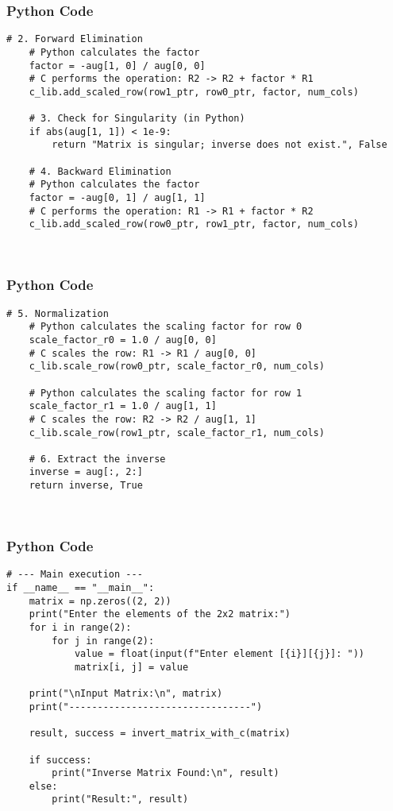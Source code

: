 \documentclass{beamer}
\begin{document}
\begin{frame}[fragile]
    \frametitle{Python Code}
    \begin{lstlisting}
# 2. Forward Elimination
    # Python calculates the factor
    factor = -aug[1, 0] / aug[0, 0]
    # C performs the operation: R2 -> R2 + factor * R1
    c_lib.add_scaled_row(row1_ptr, row0_ptr, factor, num_cols)
    
    # 3. Check for Singularity (in Python)
    if abs(aug[1, 1]) < 1e-9:
        return "Matrix is singular; inverse does not exist.", False

    # 4. Backward Elimination
    # Python calculates the factor
    factor = -aug[0, 1] / aug[1, 1]
    # C performs the operation: R1 -> R1 + factor * R2
    c_lib.add_scaled_row(row0_ptr, row1_ptr, factor, num_cols)

    
    \end{lstlisting}
\end{frame}

\begin{frame}[fragile]
    \frametitle{Python Code}
    \begin{lstlisting}
# 5. Normalization
    # Python calculates the scaling factor for row 0
    scale_factor_r0 = 1.0 / aug[0, 0]
    # C scales the row: R1 -> R1 / aug[0, 0]
    c_lib.scale_row(row0_ptr, scale_factor_r0, num_cols)
    
    # Python calculates the scaling factor for row 1
    scale_factor_r1 = 1.0 / aug[1, 1]
    # C scales the row: R2 -> R2 / aug[1, 1]
    c_lib.scale_row(row1_ptr, scale_factor_r1, num_cols)
    
    # 6. Extract the inverse
    inverse = aug[:, 2:]
    return inverse, True



    \end{lstlisting}
\end{frame}

\begin{frame}[fragile]
    \frametitle{Python Code}
    \begin{lstlisting}
# --- Main execution ---
if __name__ == "__main__":
    matrix = np.zeros((2, 2))
    print("Enter the elements of the 2x2 matrix:")
    for i in range(2):
        for j in range(2):
            value = float(input(f"Enter element [{i}][{j}]: "))
            matrix[i, j] = value

    print("\nInput Matrix:\n", matrix)
    print("--------------------------------")
    
    result, success = invert_matrix_with_c(matrix)
    
    if success:
        print("Inverse Matrix Found:\n", result)
    else:
        print("Result:", result)
    \end{lstlisting}
\end{frame}
\end{document}
